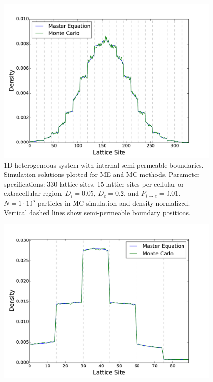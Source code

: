 	\begin{figure}[h]
		\centering
		\includegraphics[width=1.0\linewidth]{../images/1D/11U_heterogeneous_plots_1D}
		\caption{1D heterogeneous system with internal semi-permeable boundaries. Simulation solutions plotted for ME and MC methods. Parameter specifications: 330 lattice sites, 15 lattice sites per cellular or extracellular region, $ D_i = 0.05 $, $ D_e = 0.2 $, and $ P_{i\rightarrow e} = 0.01 $. $ N = 1\cdot 10^5 $ particles in MC simulation and density normalized. Vertical dashed lines show semi-permeable boundary positions.}
		\label{fig:11U_heterogeneous_plots_1D}
	\end{figure}
	
	\begin{figure}[h]
		\centering
		\includegraphics[width=1.0\linewidth]{../images/1D/3U_heterogeneous_plots_1D}
		\caption{}
		\label{fig:3U_heterogeneous_plots_1D}
	\end{figure}
	
